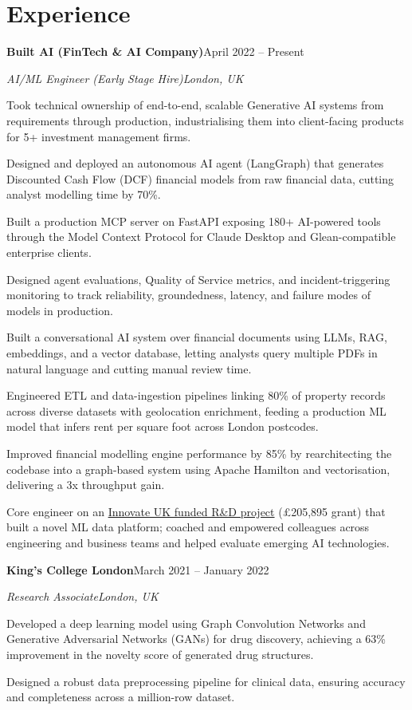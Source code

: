\documentclass[10pt,a4paper]{article}
\newcommand{\entry}[4]{%
  {\color{company}\bfseries #1}\hfill {\color{muted}#2}\par
  \vspace{1pt}
  {\itshape #3}\hfill {\color{muted}\itshape #4}\par
  \vspace{3pt}%
}
\begin{document}
\section{Experience}
\entry{Built AI (FinTech \& AI Company)}{April 2022 -- Present}{AI/ML Engineer (Early Stage Hire)}{London, UK}
\begin{tight}
  \item Took technical ownership of end-to-end, scalable Generative AI systems from requirements through production, industrialising them into client-facing products for 5+ investment management firms.
  \item Designed and deployed an autonomous AI agent (LangGraph) that generates Discounted Cash Flow (DCF) financial models from raw financial data, cutting analyst modelling time by 70\%.
  \item Built a production MCP server on FastAPI exposing 180+ AI-powered tools through the Model Context Protocol for Claude Desktop and Glean-compatible enterprise clients.
  \item Designed agent evaluations, Quality of Service metrics, and incident-triggering monitoring to track reliability, groundedness, latency, and failure modes of models in production.
  \item Built a conversational AI system over financial documents using LLMs, RAG, embeddings, and a vector database, letting analysts query multiple PDFs in natural language and cutting manual review time.
  \item Engineered ETL and data-ingestion pipelines linking 80\% of property records across diverse datasets with geolocation enrichment, feeding a production ML model that infers rent per square foot across London postcodes.
  \item Improved financial modelling engine performance by 85\% by rearchitecting the codebase into a graph-based system using Apache Hamilton and vectorisation, delivering a 3x throughput gain.
  \item Core engineer on an \href{https://gtr.ukri.org/projects?ref=10022996}{Innovate UK funded R\&D project} (\pounds205,895 grant) that built a novel ML data platform; coached and empowered colleagues across engineering and business teams and helped evaluate emerging AI technologies.
\end{tight}

\entry{King's College London}{March 2021 -- January 2022}{Research Associate}{London, UK}
\begin{tight}
  \item Developed a deep learning model using Graph Convolution Networks and Generative Adversarial Networks (GANs) for drug discovery, achieving a 63\% improvement in the novelty score of generated drug structures.
  \item Designed a robust data preprocessing pipeline for clinical data, ensuring accuracy and completeness across a million-row dataset.
\end{tight}
\end{document}

